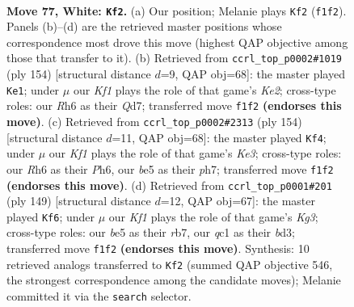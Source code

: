 \documentclass[11pt]{article}
\begin{document}
\clearpage

\begin{figure}[p]\centering
\begin{subfigure}{0.46\textwidth}\centering
\resizebox{\linewidth}{!}{%
\newchessgame
\chessboard[
  setfen={8/8/7R/4b3/8/1p1k1B2/8/2q2K2 w - - 10 77},
  showmover=false,
  pgfstyle=straightmove, color=movearrow, markmove={f1-f2}
]}
\caption{}
\end{subfigure}\hfill
\begin{subfigure}{0.46\textwidth}\centering
\resizebox{\linewidth}{!}{%
\newchessgame
\chessboard[
  setfen={8/3Q4/8/7q/p4k2/8/4K3/B7 w - - 10 78},
  showmover=false,
  pgfstyle=straightmove, color=movearrow, markmove={e2-e1}
]}
\caption{}
\end{subfigure}
\\[4pt]
\begin{subfigure}{0.46\textwidth}\centering
\resizebox{\linewidth}{!}{%
\newchessgame
\chessboard[
  setfen={Q7/7p/7P/8/8/1q2K3/8/5k2 w - - 7 78},
  showmover=false,
  pgfstyle=straightmove, color=movearrow, markmove={e3-f4}
]}
\caption{}
\end{subfigure}\hfill
\begin{subfigure}{0.46\textwidth}\centering
\resizebox{\linewidth}{!}{%
\newchessgame
\chessboard[
  setfen={8/1R6/6k1/8/7r/3B1K2/8/2b5 b - - 1 75},
  showmover=false,
  pgfstyle=straightmove, color=movearrow, markmove={g6-f6}
]}
\caption{}
\end{subfigure}
\caption{\textbf{Move 77, White: \texttt{Kf2}.} (a) Our position; Melanie plays \texttt{Kf2} (\texttt{f1f2}). Panels (b)--(d) are the retrieved master positions whose correspondence most drove this move (highest QAP objective among those that transfer to it). (b) Retrieved from \texttt{ccrl\_top\_p0002\#1019} (ply 154) [structural distance $d$=9, QAP obj=68]: the master played \texttt{Ke1}; under $\mu$ our \emph{Kf1} plays the role of that game's \emph{Ke2}; cross-type roles: our \emph{R}h6 as their \emph{Q}d7; transferred move \texttt{f1f2} \textbf{(endorses this move)}. (c) Retrieved from \texttt{ccrl\_top\_p0002\#2313} (ply 154) [structural distance $d$=11, QAP obj=68]: the master played \texttt{Kf4}; under $\mu$ our \emph{Kf1} plays the role of that game's \emph{Ke3}; cross-type roles: our \emph{R}h6 as their \emph{P}h6, our \emph{b}e5 as their \emph{p}h7; transferred move \texttt{f1f2} \textbf{(endorses this move)}. (d) Retrieved from \texttt{ccrl\_top\_p0001\#201} (ply 149) [structural distance $d$=12, QAP obj=67]: the master played \texttt{Kf6}; under $\mu$ our \emph{Kf1} plays the role of that game's \emph{Kg3}; cross-type roles: our \emph{b}e5 as their \emph{r}b7, our \emph{q}c1 as their \emph{b}d3; transferred move \texttt{f1f2} \textbf{(endorses this move)}. Synthesis: 10 retrieved analogs transferred to \texttt{Kf2} (summed QAP objective 546, the strongest correspondence among the candidate moves); Melanie committed it via the \texttt{search} selector.}
\label{fig:thought-m152}
\end{figure}
\end{document}
